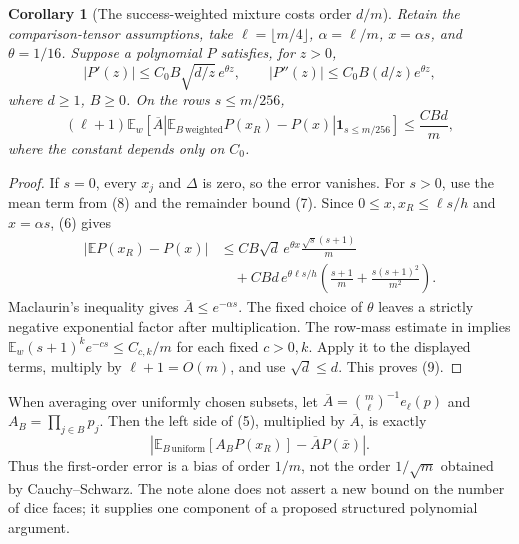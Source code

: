 \documentclass[11pt]{article}
\newtheorem{corollary}{Corollary}
\newcommand{\E}{\mathbb E}
\begin{document}
\begin{corollary}[The success-weighted mixture costs order $d/m$]\label{sharp}
Retain the comparison-tensor assumptions, take
$\ell=\lfloor m/4\rfloor$, $\alpha=\ell/m$, $x=\alpha s$,
and $\theta=1/16$. Suppose a polynomial $P$ satisfies, for $z>0$,
\[
 |P'(z)|\le C_0 B\sqrt{d/z}\,e^{\theta z},\qquad
 |P''(z)|\le C_0 B(d/z)e^{\theta z},               \tag{8}
\]
where $d\ge1$, $B\ge0$. On the rows $s\le m/256$,
\[
 (\ell+1)\E_w\left[
 \overline A\left|\E_{B\,\mathrm{weighted}}P(x_R)-P(x)\right|
 \boldsymbol1_{s\le m/256}\right]\le \frac{C B d}{m},       \tag{9}
\]
where the constant depends only on $C_0$.
\end{corollary}
\begin{proof}
If $s=0$, every $x_j$ and $\Delta$ is zero, so the error vanishes.
For $s>0$, use the mean term from (8) and the remainder bound (7).
Since $0\le x,x_R\le\ell s/h$ and $x=\alpha s$, (6) gives
\begin{align*}
 |\E P(x_R)-P(x)|
 &\le C B\sqrt d\,e^{\theta x}
              \frac{\sqrt s(s+1)}m\\
 &\quad+C Bd\,e^{\theta\ell s/h}
         \left(\frac{s+1}m+\frac{s(s+1)^2}{m^2}\right).
\end{align*}
Maclaurin's inequality gives $\overline A\le e^{-\alpha s}$.
The fixed choice of $\theta$ leaves a strictly negative exponential
factor after multiplication. The row-mass estimate in
 implies
$\E_w (s+1)^k e^{-c s}\le C_{c,k}/m$ for each fixed $c>0,k$.
Apply it to the displayed terms, multiply by $\ell+1=O(m)$, and
use $\sqrt d\le d$. This proves (9).
\end{proof}

When averaging over uniformly chosen subsets, let
$\overline A=\binom m\ell^{-1}e_\ell(p)$ and
$A_B=\prod_{j\in B}p_j$. Then the left side of (5), multiplied by
$\overline A$, is exactly
\[
 \left|\E_{B\,\mathrm{uniform}}[A_BP(x_R)]
              -\overline A P(\bar x)\right|.
\]
Thus the first-order error is a bias of order $1/m$, not the order
$1/\sqrt m$ obtained by Cauchy--Schwarz. The note alone does not
assert a new bound on the number of dice faces; it supplies one
component of a proposed structured polynomial argument.
\end{document}
